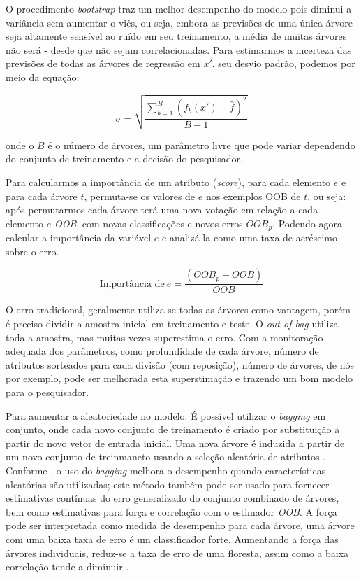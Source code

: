 \documentclass[
]{book}
\begin{document}
O procedimento \emph{bootstrap} traz um melhor desempenho do modelo pois diminui a variância sem aumentar o viés, ou seja, embora as previsões de uma única árvore seja altamente sensível ao ruído em seu treinamento, a média de muitas árvores não será - desde que não sejam correlacionadas. Para estimarmos a incerteza das previsões de todas as árvores de regressão em \(x'\), seu desvio padrão, podemos por meio da equação:

\begin{equation}
\sigma = \sqrt{\frac{\sum^B_{b=1}(f_b(x')-\hat{f})^2}{B-1}}
\label{eq:desviorf}
\end{equation}

onde o \(B\) é o número de árvores, um parâmetro livre que pode variar dependendo do conjunto de treinamento e a decisão do pesquisador.

Para calcularmos a importância de um atributo (\emph{score}), para cada elemento \(e\) e para cada árvore \(t\), permuta-se os valores de \(e\) nos exemplos OOB de \(t\), ou seja: após permutarmos cada árvore terá uma nova votação em relação a cada elemento \(e\) \emph{OOB}, com novas classificações e novos erros \(OOB_p\). Podendo agora calcular a importância da variável \(e\) e analizá-la como uma taxa de acréscimo sobre o erro.

\begin{equation}
\mbox{Importância de} \ e = \frac{(OOB_p-OOB)}{OOB}
\label{eq:impc}
\end{equation}

O erro tradicional, geralmente utiliza-se todas as árvores como vantagem, porém é preciso dividir a amostra inicial em treinamento e teste. O \emph{out of bag} utiliza toda a amostra, mas muitas vezes superestima o erro. Com a monitoração adequada dos parâmetros, como profundidade de cada árvore, número de atributos sorteados para cada divisão (com reposição), número de árvores, de nós por exemplo, pode ser melhorada esta superstimação e trazendo um bom modelo para o pesquisador.

Para aumentar a aleatoriedade no modelo. É possível utilizar o \emph{bagging} em conjunto, onde cada novo conjunto de treinamento é criado por substituição a partir do novo vetor de entrada inicial. Uma nova árvore é induzida a partir de um novo conjunto de treinmaneto usando a seleção aleatória de atributos \citep{gomez2012random}. Conforme \citep{breiman2001random}, o uso do \emph{bagging} melhora o desempenho quando características aleatórias são utilizadas; este método também pode ser usado para fornecer estimativas contínuas do erro generalizado do conjunto combinado de árvores, bem como estimativas para força e correlação com o estimador \emph{OOB}. A força pode ser interpretada como medida de desempenho para cada árvore, uma árvore com uma baixa taxa de erro é um classificador forte. Aumentando a força das árvores individuais, reduz-se a taxa de erro de uma floresta, assim como a baixa correlação tende a diminuir \citep{oshiro2013abordagem}.
\end{document}
